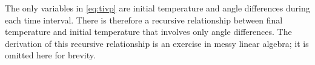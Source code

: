 \documentclass[journal,twoside]{IEEEtran}
\begin{document}
The only variables in \eqref{eq:tivp} are initial temperature and angle differences during each time interval. There is therefore a recursive relationship between final temperature and initial temperature that involves only angle differences. The derivation of this recursive relationship is an exercise in messy linear algebra; it is omitted here for brevity.
%
%
\end{document}
